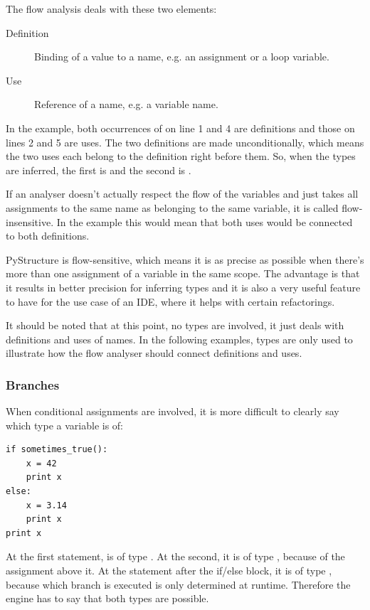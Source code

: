 \documentclass[12pt,halfparskip,DIV11,BCOR10mm]{scrreprt}
\begin{document}
The flow analysis deals with these two elements:

\begin{description}
	\item[Definition] Binding of a value to a name, e.g. an assignment or a  loop variable.
	\item[Use] Reference of a name, e.g. a variable name.
\end{description}

In the example, both occurrences of  on line 1 and 4 are definitions and those on lines 2 and 5 are uses. The two definitions are made unconditionally, which means the two uses each belong to the definition right before them. So, when the types are inferred, the first  is  and the second is .

If an analyser doesn't actually respect the flow of the variables and just takes all assignments to the same name as belonging to the same variable, it is called flow-insensitive. In the example this would mean that both uses would be connected to both definitions.


PyStructure is flow-sensitive, which means it is as precise as possible when there's more than one assignment of a variable in the same scope. The advantage is that it results in better precision for inferring types and it is also a very useful feature to have for the use case of an IDE, where it helps with certain refactorings.

It should be noted that at this point, no types are involved, it just deals with definitions and uses of names. In the following examples, types are only used to illustrate how the flow analyser should connect definitions and uses.

\subsubsection{Branches}

When conditional assignments are involved, it is more difficult to clearly say which type a variable is of:

\begin{lstlisting}
if sometimes_true():
    x = 42
    print x
else:
    x = 3.14
    print x
print x
\end{lstlisting}

At the first  statement,  is of type . At the second, it is of type , because of the assignment above it. At the  statement after the if/else block, it is of type , because which branch is executed is only determined at runtime. Therefore the engine has to say that both types are possible. 
\end{document}
